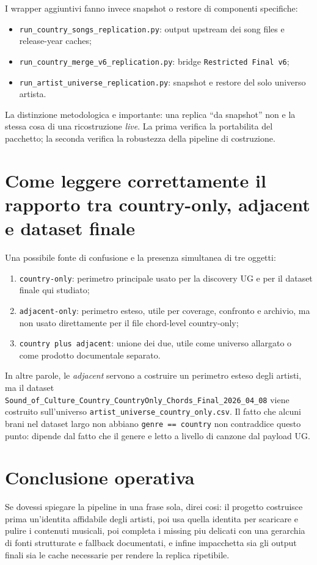 \documentclass[11pt]{article}
\begin{document}
I wrapper aggiuntivi fanno invece snapshot o restore di componenti specifiche:
\begin{itemize}[leftmargin=2em]
\item \texttt{run\_country\_songs\_replication.py}: output upstream dei song files e release-year caches;
\item \texttt{run\_country\_merge\_v6\_replication.py}: bridge \texttt{Restricted Final v6};
\item \texttt{run\_artist\_universe\_replication.py}: snapshot e restore del solo universo artista.
\end{itemize}

La distinzione metodologica e importante: una replica ``da snapshot'' non e la stessa cosa di una ricostruzione \emph{live}. La prima verifica la portabilita del pacchetto; la seconda verifica la robustezza della pipeline di costruzione.

\section{Come leggere correttamente il rapporto tra country-only, adjacent e dataset finale}
Una possibile fonte di confusione e la presenza simultanea di tre oggetti:
\begin{enumerate}[leftmargin=2em]
\item \texttt{country-only}: perimetro principale usato per la discovery UG e per il dataset finale qui studiato;
\item \texttt{adjacent-only}: perimetro esteso, utile per coverage, confronto e archivio, ma non usato direttamente per il file chord-level country-only;
\item \texttt{country plus adjacent}: unione dei due, utile come universo allargato o come prodotto documentale separato.
\end{enumerate}

In altre parole, le \emph{adjacent} servono a costruire un perimetro esteso degli artisti, ma il dataset \texttt{Sound\_of\_Culture\_Country\_CountryOnly\_Chords\_Final\_2026\_04\_08} viene costruito sull'universo \texttt{artist\_universe\_country\_only.csv}. Il fatto che alcuni brani nel dataset largo non abbiano \texttt{genre == country} non contraddice questo punto: dipende dal fatto che il genere e letto a livello di canzone dal payload UG.

\section{Conclusione operativa}
Se dovessi spiegare la pipeline in una frase sola, direi cosi: il progetto costruisce prima un'identita affidabile degli artisti, poi usa quella identita per scaricare e pulire i contenuti musicali, poi completa i missing piu delicati con una gerarchia di fonti strutturate e fallback documentati, e infine impacchetta sia gli output finali sia le cache necessarie per rendere la replica ripetibile.
\end{document}
